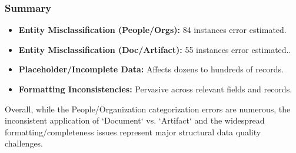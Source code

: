 \subsubsection{Summary}
\begin{itemize}
    \item \textbf{Entity Misclassification (People/Orgs):} 84 instances error estimated.
    \item \textbf{Entity Misclassification (Doc/Artifact):} 55 instances error estimated..
    \item \textbf{Placeholder/Incomplete Data:} Affects dozens to hundreds of records.
    \item \textbf{Formatting Inconsistencies:} Pervasive across relevant fields and records.
\end{itemize}
Overall, while the People/Organization categorization errors are numerous, the inconsistent application of `Document` vs. `Artifact` and the widespread formatting/completeness issues represent major structural data quality challenges.
